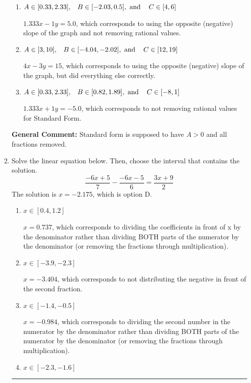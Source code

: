 \documentclass{extbook}[14pt]
\newcommand{\litem}[1]{\item #1

\rule{\textwidth}{0.4pt}}
\begin{document}
\begin{enumerate}
{\begin{enumerate}[label=\Alph*.]
 $-4x - 3y = 15$, which corresponds to not making $A$ positive (by multiplying the equation by $-1$).
\item \( A \in [0.33, 2.33], \hspace{3mm} B \in [-2.03, 0.5], \text{ and } \hspace{3mm} C \in [4, 6] \)

 $1.333x - 1y = 5.0$, which corresponds to using the opposite (negative) slope of the graph and not removing rational values.
\item \( A \in [3, 10], \hspace{3mm} B \in [-4.04, -2.02], \text{ and } \hspace{3mm} C \in [12, 19] \)

 $4x - 3y = 15$, which corresponds to using the opposite (negative) slope of the graph, but did everything else correctly.
\item \( A \in [0.33, 2.33], \hspace{3mm} B \in [0.82, 1.89], \text{ and } \hspace{3mm} C \in [-8, 1] \)

 $1.333x + 1y = -5.0$, which corresponds to not removing rational values for Standard Form.
\end{enumerate}

\textbf{General Comment:} Standard form is supposed to have $A > 0$ and all fractions removed.
}
\litem{
Solve the linear equation below. Then, choose the interval that contains the solution.
\[ \frac{-6x + 5}{7} - \frac{-6x -5}{6} = \frac{3x + 9}{2} \]
The solution is \( x = -2.175 \), which is option D.\begin{enumerate}[label=\Alph*.]
\item \( x \in [0.4, 1.2] \)

 $x = 0.737$, which corresponds to dividing the coefficients in front of x by the denominator rather than dividing BOTH parts of the numerator by the denominator (or removing the fractions through multiplication).
\item \( x \in [-3.9, -2.3] \)

 $x = -3.404$, which corresponds to not distributing the negative in front of the second fraction.
\item \( x \in [-1.4, -0.5] \)

 $x = -0.984$, which corresponds to dividing the second number in the numerator by the denominator rather than dividing BOTH parts of the numerator by the denominator (or removing the fractions through multiplication).
\item \( x \in [-2.3, -1.6] \)


\end{enumerate}}
\end{enumerate}
\end{document}

